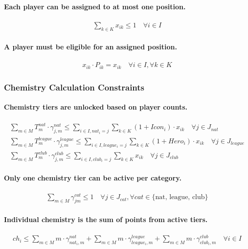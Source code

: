 \documentclass{article}
\begin{document}
\paragraph{Each player can be assigned to at most one position.}
\begin{gather}
    \sum_{k \in K} x_{ik} \leq 1 \quad \forall i \in I
\end{gather}
\paragraph{A player must be eligible for an assigned position.}
\begin{gather}
    x_{ik} \cdot P_{ik} = x_{ik} \quad \forall i \in I, \forall k \in K
\end{gather}

\subsubsection{Chemistry Calculation Constraints}
\paragraph{Chemistry tiers are unlocked based on player counts.}
\begin{gather}
    \sum_{m \in M} T^{nat}_m \cdot \gamma^{nat}_{j,m} \leq \sum_{i \in I, nat_i=j} \sum_{k \in K} (1 + Icon_i) \cdot x_{ik} \quad \forall j \in J_{nat} \\
    \sum_{m \in M} T^{league}_m \cdot \gamma^{league}_{j,m} \leq \sum_{i \in I, league_i=j} \sum_{k \in K} (1 + Hero_i) \cdot x_{ik} \quad \forall j \in J_{league} \\
    \sum_{m \in M} T^{club}_m \cdot \gamma^{club}_{j,m} \leq \sum_{i \in I, club_i=j} \sum_{k \in K} x_{ik} \quad \forall j \in J_{club}
\end{gather}
\paragraph{Only one chemistry tier can be active per category.}
\begin{gather}
    \sum_{m \in M} \gamma^{cat}_{jm} \leq 1 \quad \forall j \in J_{cat}, \forall cat \in \{\text{nat, league, club}\}
\end{gather}
\paragraph{Individual chemistry is the sum of points from active tiers.}
\begin{gather}
    ch_i \leq \sum_{m \in M} m \cdot \gamma^{nat}_{nat_i, m} + \sum_{m \in M} m \cdot \gamma^{league}_{league_i, m} + \sum_{m \in M} m \cdot \gamma^{club}_{club_i, m} \quad \forall i \in I
\end{gather}
\end{document}
